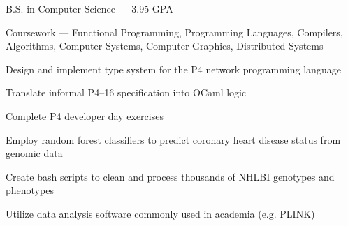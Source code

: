 \documentclass{resume}
\begin{document}
\begin{education}
    \begin{description}
        \item B.S. in Computer Science --- 3.95 GPA
        \item Coursework ---
            Functional Programming,
            Programming Languages,
            Compilers,
            Algorithms,
            Computer Systems,
            Computer Graphics,
            Distributed Systems
    \end{description}
\end{education}

\begin{research experience}
    \begin{description}
        \item Design and implement type system for the P4 network programming language
        \item Translate informal P4--16 specification into OCaml logic
        \item Complete P4 developer day exercises
    \end{description}
    \begin{description}
        \item Employ random forest classifiers to predict coronary heart disease status from genomic data
        \item Create bash scripts to clean and process thousands of NHLBI genotypes and phenotypes
        \item Utilize data analysis software commonly used in academia (e.g. PLINK)
    \end{description}
\end{research experience}
\end{document}
